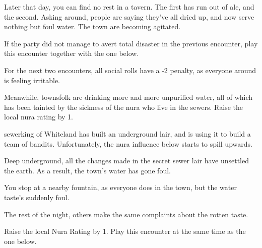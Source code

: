 \begin{multicols}{2}

\begin{boxtext}

	Later that day, you can find no rest in a tavern.  The first has run out of ale, and the second.  Asking around, people are saying they've all dried up, and now serve nothing but foul water.  The town are becoming agitated.

\end{boxtext}

If the party did not manage to avert total disaster in the previous encounter, play this encounter together with the one below.

For the next two encounters, all social rolls have a -2 penalty, as everyone around is feeling irritable.

Meanwhile, townsfolk are drinking more and more unpurified water, all of which has been tainted by the sickness of the nura who live in the sewers.  Raise the local nura rating by 1.

\stopcontents[sq]

\label{sewerbandits}

\startcontents[sq]

\sqminitoc

\Gls{sewerking} of Whiteland has built an underground lair, and is using it to build a team of bandits.
Unfortunately, the nura influence below starts to spill upwards.


Deep underground, all the changes made in the secret sewer lair have unsettled the earth.
As a result, the town's water has gone foul.

\begin{boxtext}

	You stop at a nearby fountain, as everyone does in the town, but the water taste's suddenly foul.

	The rest of the night, others make the same complaints about the rotten taste.

\end{boxtext}

Raise the local Nura Rating by 1.
Play this encounter at the same time as the one below.



\end{multicols}
